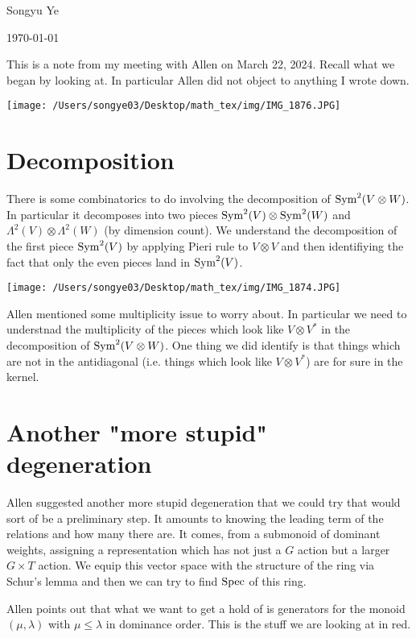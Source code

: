 \documentclass[12pt]{article}
\begin{document}
Songyu Ye

\today

\hfill

This is a note from my meeting with Allen on March 22, 2024. Recall what we began by looking at.
In particular Allen did not object to anything I wrote down.

\begin{center}
    \texttt{[image: /Users/songye03/Desktop/math\_tex/img/IMG\_1876.JPG]}
\end{center}

\section{Decomposition}
There is some combinatorics to do involving the decomposition of $\operatorname{Sym}^2(V\otimes W)$. In particular
it decomposes into two pieces $\operatorname{Sym}^2(V)\otimes \operatorname{Sym}^2(W)$ and $\Lambda^2(V)\otimes \Lambda^2(W)$
(by dimension count). We understand the decomposition of the first piece $\operatorname{Sym}^2(V)$ by applying Pieri rule
to $V\otimes V$ and then identifiying the fact that only the even pieces land in $\operatorname{Sym}^2(V)$.

\begin{center}
    \texttt{[image: /Users/songye03/Desktop/math\_tex/img/IMG\_1874.JPG]}
\end{center}

Allen mentioned some multiplicity issue to worry about. In particular we need to understnad the multiplicity 
of the pieces which look like $V\otimes V^*$ in the decomposition of $\operatorname{Sym}^2(V\otimes W)$.
One thing we did identify is that things which are not in the antidiagonal 
(i.e. things which look like $V\otimes V^*$) are for sure in the kernel.


\section{Another "more stupid" degeneration}
Allen suggested another more stupid degeneration that we could try that would sort of be a preliminary step.
It amounts to knowing the leading term of the relations and how many there are. It comes, from a 
submonoid of dominant weights, assigning a representation which has not just a $G$ action 
but a larger $G\times T$ action. We equip 
this vector space with the structure of the ring via Schur's lemma and then 
we can try to find $\operatorname{Spec}$ of this ring.

\hfill

Allen points out that what we want to get a hold of is generators for the monoid $(\mu,\lambda)$ with 
$\mu \leq \lambda$ in dominance order. This is the stuff we are looking at in red.
\end{document}
